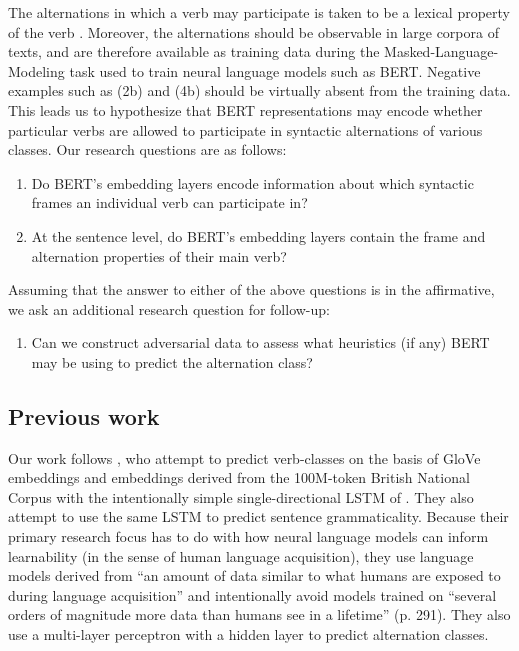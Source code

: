 \documentclass[11pt]{article}
\begin{document}
The alternations in which a verb may participate is taken to be a lexical property of the verb \citep[e.g.][]{pinker1989,levin1993,levin1995unaccusativity,shafer2009causative}.  Moreover, the alternations should be observable in large corpora of texts, and are therefore available as training data during the Masked-Language-Modeling task used to train neural language models such as BERT.  Negative examples such as (2b) and (4b) should be virtually absent from the training data.  This leads us to hypothesize that BERT representations may encode whether particular verbs are allowed to participate in syntactic alternations of various classes.  Our research questions are as follows:

\begin{enumerate}
    \item Do BERT's embedding layers encode information about which syntactic frames an individual verb can participate in?
    \item At the sentence level, do BERT's embedding layers contain the frame and alternation properties of their main verb?
\end{enumerate}

Assuming that the answer to either of the above questions is in the affirmative, we ask an additional research question for follow-up:

\begin{enumerate}[resume]
    \item Can we construct adversarial data to assess what heuristics (if any) BERT may be using to predict the alternation class?
\end{enumerate}

\subsection{Previous work}
Our work follows \citet{kann-etal-2019-verb}, who attempt to predict verb-classes on the basis of GloVe embeddings \citep{glove} and embeddings derived from the 100M-token British National Corpus with the intentionally simple single-directional LSTM of \citealt{warstadt2019neural}.  They also attempt to use the same LSTM to predict sentence grammaticality.  Because their primary research focus has to do with how neural language models can inform learnability (in the sense of human language acquisition), they use language models derived from ``an amount of data similar to what humans are exposed to during language acquisition'' and intentionally avoid models trained on ``several orders of magnitude more data than humans see in a lifetime'' (p. 291).  They also use a multi-layer perceptron with a hidden layer to predict alternation classes.  
\end{document}
